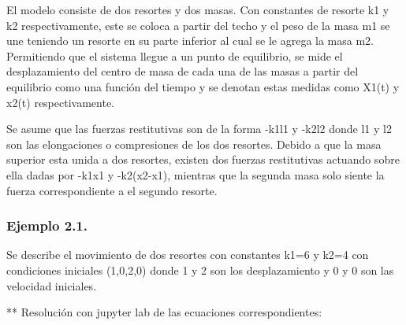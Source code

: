 \documentclass{article} %
\begin{document}
El modelo consiste de dos resortes y dos masas. Con constantes de resorte k1 y k2 respectivamente, este se coloca a partir del techo y el peso de la masa m1 se une teniendo un resorte en su parte inferior al cual se le agrega la masa m2. Permitiendo que el sistema llegue a un punto de equilibrio, se mide el desplazamiento del centro de masa de cada una de las masas a partir del equilibrio como una función del tiempo y se denotan estas medidas como X1(t) y x2(t) respectivamente. 

\vspace{0.5 cm}

Se asume que las fuerzas restitutivas son de la forma -k1l1 y -k2l2 donde l1 y l2 son las elongaciones o compresiones de los dos resortes. Debido a que la masa superior esta unida a dos resortes, existen dos fuerzas restitutivas actuando sobre ella dadas por -k1x1 y -k2(x2-x1), mientras que la segunda masa solo siente la fuerza correspondiente a el segundo resorte. 

\subsubsection{Ejemplo 2.1.}
Se describe el movimiento de dos resortes con constantes k1=6 y k2=4 con condiciones iniciales (1,0,2,0) donde 1 y 2 son los desplazamiento y 0 y 0 son las velocidad iniciales. 

\vspace{0.5 cm}

** Resolución con jupyter lab de las ecuaciones correspondientes:
\end{document}
